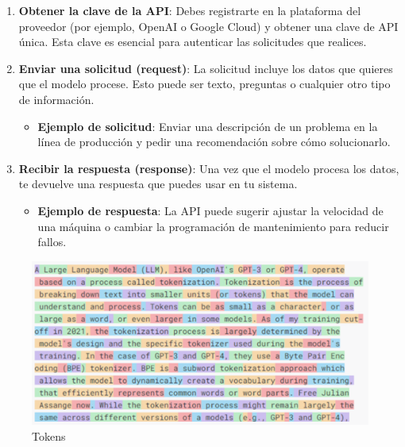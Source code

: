 \documentclass[
  10pt,
  letterpaper,
]{book}
\providecommand{\tightlist}{%
  \setlength{\itemsep}{0pt}\setlength{\parskip}{0pt}}\usepackage{longtable,booktabs,array}
\begin{document}
\begin{enumerate}
\def\labelenumi{\arabic{enumi}.}
\item
  \textbf{Obtener la clave de la API}: Debes registrarte en la
  plataforma del proveedor (por ejemplo, OpenAI o Google Cloud) y
  obtener una clave de API única. Esta clave es esencial para autenticar
  las solicitudes que realices.
\item
  \textbf{Enviar una solicitud (request)}: La solicitud incluye los
  datos que quieres que el modelo procese. Esto puede ser texto,
  preguntas o cualquier otro tipo de información.

  \begin{itemize}
  \tightlist
  \item
    \textbf{Ejemplo de solicitud}: Enviar una descripción de un problema
    en la línea de producción y pedir una recomendación sobre cómo
    solucionarlo.
  \end{itemize}
\item
  \textbf{Recibir la respuesta (response)}: Una vez que el modelo
  procesa los datos, te devuelve una respuesta que puedes usar en tu
  sistema.

  \begin{itemize}
  \tightlist
  \item
    \textbf{Ejemplo de respuesta}: La API puede sugerir ajustar la
    velocidad de una máquina o cambiar la programación de mantenimiento
    para reducir fallos.
  \end{itemize}
\end{enumerate}

\begin{figure}[H]

{\centering \includegraphics{Img/token.png}

}

\caption{Tokens}

\end{figure}%
\end{document}
